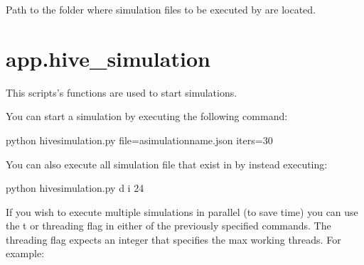 \documentclass[letterpaper,10pt,english]{sphinxmanual}
\begin{document}
\begin{fulllineitems}
\label{\detokenize{app:app.environment_settings.SIMULATION_ROOT}}
Path to the folder where simulation files to be executed by
{\hyperref[\detokenize{app:module-app.hive_simulation}]{}} are located.

\end{fulllineitems}



\section{app.hive\_simulation}
\label{\detokenize{app:module-app.hive_simulation}}\label{\detokenize{app:app-hive-simulation}}
This scripts’s functions are used to start simulations.

You can start a simulation by executing the following command:

\begin{sphinxVerbatim}[commandchars=\\\{\}]
\PYGZdl{} python hive\PYGZus{}simulation.py \PYGZhy{}\PYGZhy{}file=a\PYGZus{}simulation\PYGZus{}name.json \PYGZhy{}\PYGZhy{}iters=30
\end{sphinxVerbatim}

You can also execute all simulation file that exist in
{\hyperref[\detokenize{app:app.environment_settings.SIMULATION_ROOT}]{}} by instead executing:

\begin{sphinxVerbatim}[commandchars=\\\{\}]
\PYGZdl{} python hive\PYGZus{}simulation.py \PYGZhy{}d \PYGZhy{}i 24
\end{sphinxVerbatim}

If you wish to execute multiple simulations in parallel (to save time) you
can use the \sphinxhyphen{}t or \textendash{}threading flag in either of the previously specified
commands. The threading flag expects an integer that specifies the max
working threads. For example:
\end{document}
